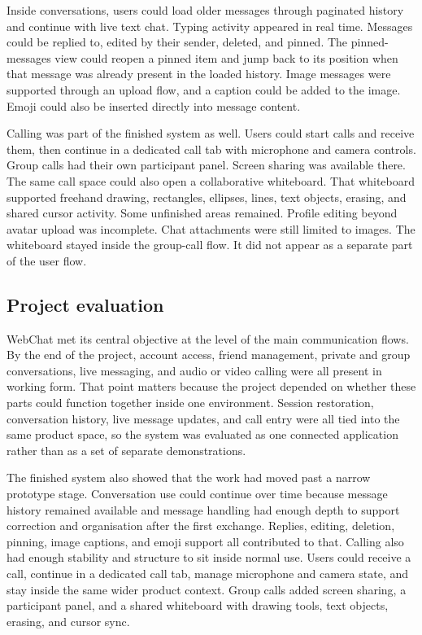 \documentclass[12pt,a4paper]{article}
\begin{document}
Inside conversations, users could load older messages through paginated history and continue with live text chat. Typing activity appeared in real time. Messages could be replied to, edited by their sender, deleted, and pinned. The pinned-messages view could reopen a pinned item and jump back to its position when that message was already present in the loaded history. Image messages were supported through an upload flow, and a caption could be added to the image. Emoji could also be inserted directly into message content.

Calling was part of the finished system as well. Users could start calls and receive them, then continue in a dedicated call tab with microphone and camera controls. Group calls had their own participant panel. Screen sharing was available there. The same call space could also open a collaborative whiteboard. That whiteboard supported freehand drawing, rectangles, ellipses, lines, text objects, erasing, and shared cursor activity. Some unfinished areas remained. Profile editing beyond avatar upload was incomplete. Chat attachments were still limited to images. The whiteboard stayed inside the group-call flow. It did not appear as a separate part of the user flow.

\subsection{Project evaluation}
WebChat met its central objective at the level of the main communication flows. By the end of the project, account access, friend management, private and group conversations, live messaging, and audio or video calling were all present in working form. That point matters because the project depended on whether these parts could function together inside one environment. Session restoration, conversation history, live message updates, and call entry were all tied into the same product space, so the system was evaluated as one connected application rather than as a set of separate demonstrations.

The finished system also showed that the work had moved past a narrow prototype stage. Conversation use could continue over time because message history remained available and message handling had enough depth to support correction and organisation after the first exchange. Replies, editing, deletion, pinning, image captions, and emoji support all contributed to that. Calling also had enough stability and structure to sit inside normal use. Users could receive a call, continue in a dedicated call tab, manage microphone and camera state, and stay inside the same wider product context. Group calls added screen sharing, a participant panel, and a shared whiteboard with drawing tools, text objects, erasing, and cursor sync.
\end{document}
